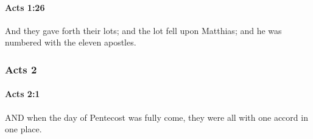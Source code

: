 		\paragraph{Acts 1:26} %
			\label{ACTS-1-26}

			And they gave forth their lots; and the lot fell upon Matthias; and he was numbered with the eleven apostles.

			\begin{framed}
			\scriptsize
				\begin{compactdesc}
					\item[SBLG] 
				\end{compactdesc}
			\end{framed}

	\subsubsection{Acts 2} %
		\label{ACTS-2}
		
		\paragraph{Acts 2:1} %
			\label{ACTS-2-1}

			AND when the day of Pentecost was fully come, they were all with one accord in one place.

